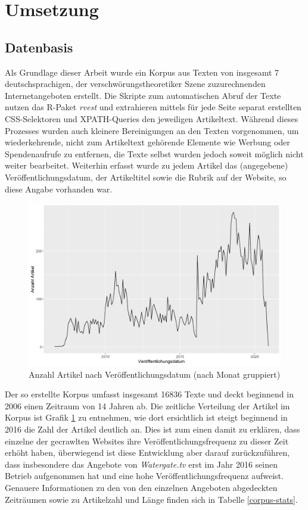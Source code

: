 \section{Umsetzung}

\subsection{Datenbasis}

Als Grundlage dieser Arbeit wurde ein Korpus aus Texten von insgesamt 7 deutschsprachigen, der verschwörungstheoretiker Szene zuzurechnenden Internetangeboten erstellt.
Die Skripte zum automatischen Abruf der Texte nutzen das R-Paket \textit{rvest} \parencite{rvest} und extrahieren mittels für jede Seite separat erstellten CSS-Selektoren und XPATH-Queries den jeweiligen Artikeltext.
Während dieses Prozesses wurden auch kleinere Bereinigungen an den Texten vorgenommen, um wiederkehrende, nicht zum Artikeltext gehörende Elemente wie Werbung oder Spendenaufrufe zu entfernen, die Texte selbst wurden jedoch soweit möglich nicht weiter bearbeitet.
Weiterhin erfasst wurde zu jedem Artikel das (angegebene) Veröffentlichungsdatum, der Artikeltitel sowie die Rubrik auf der Website, so diese Angabe vorhanden war.

\begin{figure}[h]
    \centering
    \includegraphics[scale=0.45]{graphics/cons_freq_time.jpg}
    \caption{Anzahl Artikel nach Veröffentlichungsdatum (nach Monat gruppiert)}
    \label{article-frequency}
\end{figure}

Der so erstellte Korpus umfasst insgesamt 16836 Texte und deckt beginnend in 2006 einen Zeitraum von 14 Jahren ab.
Die zeitliche Verteilung der Artikel im Korpus ist Grafik \ref{article-frequency} zu entnehmen, wie dort ersichtlich ist steigt beginnend in 2016 die Zahl der Artikel deutlich an.
Dies ist zum einen damit zu erklären, dass einzelne der gecrawlten Websites ihre Veröffentlichungsfrequenz zu dieser Zeit erhöht haben, überwiegend ist diese Entwicklung aber darauf zurückzuführen, dass insbesondere das Angebote von \textit{Watergate.tv} erst im Jahr 2016 seinen Betrieb aufgenommen hat und eine hohe Veröffentlichungsfrequenz aufweist. 
Genauere Informationen zu den von den einzelnen Angeboten abgedeckten Zeiträumen sowie zu Artikelzahl und Länge finden sich in Tabelle \ref{corpus-stats}.


